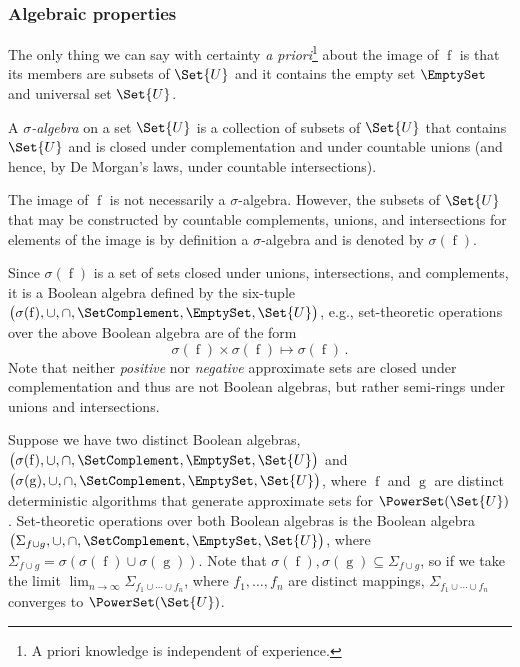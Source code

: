 \documentclass[ ../main.tex]{subfiles}
\begin{document}
\subsubsection{Algebraic properties}
The only thing we can say with certainty \emph{a priori}\footnote{A priori 
knowledge is independent of experience.}  about the image of $\operatorname{f}$ 
is that its members are subsets of $\Set{U}$ and it contains the empty set 
$\EmptySet$ and universal set $\Set{U}$.
\begin{definition}
A \emph{$\sigma$-algebra} on a set $\Set{U}$ is a collection of subsets of $\Set{U}$ that contains $\Set{U}$ and is closed under complementation and under countable unions (and hence, by De Morgan's laws, under countable intersections).
\end{definition}
The image of $\operatorname{f}$ is not necessarily a $\sigma$-algebra. However, 
the subsets of $\Set{U}$ that may be constructed by countable complements, 
unions, and intersections for elements of the image is by definition a 
$\sigma$-algebra and is denoted by $\sigma(\operatorname{f})$.

Since $\sigma(\operatorname{f})$ is a set of sets closed under unions, 
intersections, and complements, it is a Boolean algebra defined by the six-tuple 
$\left(
    \sigma(\operatorname{f}), \cup, \cap, \SetComplement, \EmptySet,\Set{U}
\right)$,
e.g., set-theoretic operations over the above Boolean algebra are of the form
\begin{equation}
    \sigma(\operatorname{f}) \times \sigma(\operatorname{f}) 
        \mapsto \sigma(\operatorname{f})\,.
\end{equation}
Note that neither \emph{positive} nor \emph{negative} approximate sets are closed under complementation and thus are not Boolean algebras, but rather semi-rings under unions and intersections.

Suppose we have two distinct Boolean algebras,
$\left(
    \sigma(\operatorname{f}), \cup, \cap, \SetComplement, \EmptySet,\Set{U}
\right)$ and 
$\left(
    \sigma(\operatorname{g}), \cup, \cap, \SetComplement, \EmptySet,\Set{U}
\right)$,
where $\operatorname{f}$ and $\operatorname{g}$ are distinct deterministic
algorithms that generate approximate sets for $\PowerSet(\Set{U})$.
Set-theoretic operations over both Boolean algebras is the Boolean algebra
$\left(
    \Sigma_{f \cup g}, \cup, \cap, \SetComplement, \EmptySet,\Set{U}
\right)$,
where $\Sigma_{f \cup g} = 
    \sigma\!\left(\sigma(\operatorname{f}) \cup \sigma(\operatorname{g})
\right)$.
Note that $\sigma(\operatorname{f}), \sigma(\operatorname{g}) 
    \subseteq \Sigma_{f \cup g}$,
so if we take the limit
    $\lim_{n \to \infty} \Sigma_{f_1 \cup \cdots \cup f_n}$,
where $f_1,\ldots,f_n$ are distinct mappings, $\Sigma_{f_1 \cup \cdots \cup f_n}$ converges to $\PowerSet(\Set{U})$.
\end{document}
